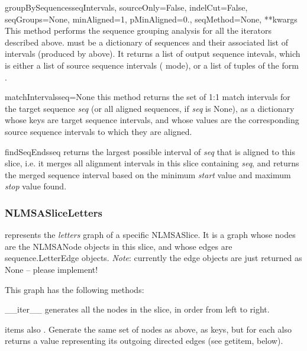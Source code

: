 \documentclass{howto}
\begin{document}
\begin{funcdesc}{groupBySequences}{seqIntervals, sourceOnly=False, indelCut=False, seqGroups=None, minAligned=1, pMinAligned=0., seqMethod=None, **kwargs}
  This method performs the sequence grouping analysis for all the iterators
  described above.   must be a dictionary of sequences
  and their associated list of intervals (produced by 
  above).  It returns a list of output sequence intevals, which is either
  a list of source sequence intervals ( mode), or a list
  of tuples of the form .
\end{funcdesc}


\begin{funcdesc}{matchIntervals}{seq=None}
  this method returns the set of
  1:1 match intervals for the target sequence {\em seq} (or all
  aligned sequences, if {\em seq} is None), as a dictionary
  whose keys are target sequence intervals, and whose values are
  the corresponding source sequence intervals to which they are
  aligned.
\end{funcdesc}

\begin{funcdesc}{findSeqEnds}{seq}
  returns the largest possible interval of
  {\em seq} that is aligned to this slice, i.e. it merges all 
  alignment intervals in this slice containing {\em seq}, and
  returns the merged sequence interval based on the minimum {\em start}
  value and maximum {\em stop} value found.
\end{funcdesc}

\subsubsection{NLMSASliceLetters}
represents the {\em letters} graph of a specific NLMSASlice.  It is
a graph whose nodes are the NLMSANode objects in this slice, and whose
edges are sequence.LetterEdge objects. {\em Note}: currently the edge objects
are just returned as None -- please implement!

This graph has the following methods:

\begin{funcdesc}{__iter__}{}
  generates all the nodes in the slice, in order from left to right.
\end{funcdesc}

\begin{funcdesc}{items}{}
  also . Generate the same set of nodes as above,
  as keys, but for each also returns a value representing its outgoing
  directed edges (see getitem, below).
\end{funcdesc}
\end{document}
